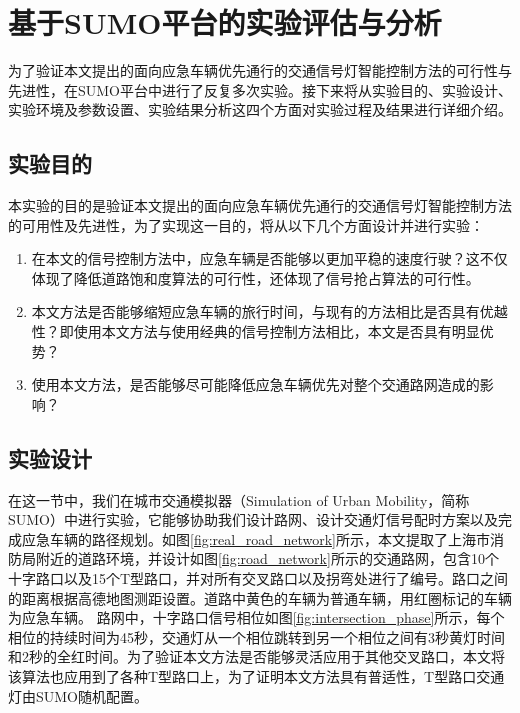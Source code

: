 \chapter{基于SUMO平台的实验评估与分析}
\label{ch5}

为了验证本文提出的面向应急车辆优先通行的交通信号灯智能控制方法的可行性与先进性，在SUMO平台中进行了反复多次实验。接下来将从实验目的、实验设计、实验环境及参数设置、实验结果分析这四个方面对实验过程及结果进行详细介绍。

\section{实验目的}
本实验的目的是验证本文提出的面向应急车辆优先通行的交通信号灯智能控制方法的可用性及先进性，为了实现这一目的，将从以下几个方面设计并进行实验：

\begin{enumerate}
	\item 在本文的信号控制方法中，应急车辆是否能够以更加平稳的速度行驶？这不仅体现了降低道路饱和度算法的可行性，还体现了信号抢占算法的可行性。
	\item 本文方法是否能够缩短应急车辆的旅行时间，与现有的方法相比是否具有优越性？即使用本文方法与使用经典的信号控制方法相比，本文是否具有明显优势？
	\item 使用本文方法，是否能够尽可能降低应急车辆优先对整个交通路网造成的影响？
\end{enumerate}

\section{实验设计}
在这一节中，我们在城市交通模拟器（Simulation of Urban Mobility，简称SUMO）中进行实验，它能够协助我们设计路网、设计交通灯信号配时方案以及完成应急车辆的路径规划。如图\ref{fig:real_road_network}所示，本文提取了上海市消防局附近的道路环境，并设计如图\ref{fig:road_network}所示的交通路网，包含10个十字路口以及15个T型路口，并对所有交叉路口以及拐弯处进行了编号。路口之间的距离根据高德地图测距设置。道路中黄色的车辆为普通车辆，用红圈标记的车辆为应急车辆。 路网中，十字路口信号相位如图\ref{fig:intersection_phase}所示，每个相位的持续时间为45秒，交通灯从一个相位跳转到另一个相位之间有3秒黄灯时间和2秒的全红时间。为了验证本文方法是否能够灵活应用于其他交叉路口，本文将该算法也应用到了各种T型路口上，为了证明本文方法具有普适性，T型路口交通灯由SUMO随机配置。

